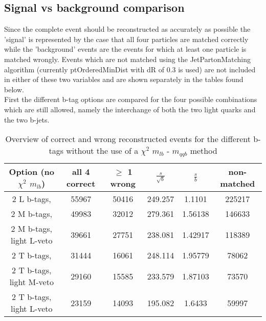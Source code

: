 \documentclass[a4paper,12pt]{report}
\begin{document}
\subsection{Signal vs background comparison}
Since the complete event should be reconstructed as accurately as possible the 'signal' is represented by the case that all four particles are matched correctly while the 'background' events are the events for which at least one particle is matched wrongly.
Events which are not matched using the JetPartonMatching algorithm (currently ptOrderedMinDist with dR of 0.3 is used) are not included in either of these two variables and are shown separately in the tables found below.\\
First the different b-tag options are compared for the four possible combinations which are still allowed, namely the interchange of both the two light quarks and the two b-jets.

 \begin{table}[!h] 
 \begin{tabular}{c|c|c|c|c|c} 
 \textbf{Option} (no $\chi^{2}$ $m_{lb}$) & all 4 correct   & $\geq$ 1 wrong       & $\frac{s}{\sqrt{b}}$ & $\frac{s}{b}$ & non-matched \\ \hline 
2 L b-tags,                & 55967 & 50416 & 249.257 & 1.1101 & 225217 \\ 
2 M b-tags,              & 49983 & 32012 & 279.361 & 1.56138 & 146633 \\ 
2 M b-tags, light L-veto & 39661 & 27751 & 238.081 & 1.42917 & 118389 \\ 
2 T b-tags,              & 31444 & 16061 & 248.114 & 1.95779 & 78062 \\ 
2 T b-tags, light M-veto & 29160 & 15585 & 233.579 & 1.87103 & 73570 \\ 
2 T b-tags, light L-veto & 23159 & 14093 & 195.082 & 1.6433 & 59997 \\ 
 \end{tabular} 
 \caption{Overview of correct and wrong reconstructed events for the different b-tags without the use of a $\chi^{2}$ $m_{lb}$ - $m_{qqb}$ method} 
 \end{table} 
 
\end{document}
